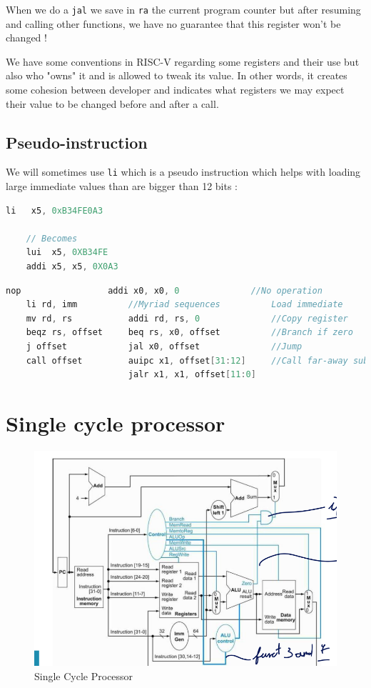 \documentclass{report}
\begin{document}
When we do a \verb|jal| we save in \verb|ra| the current program counter but after resuming and calling other functions, we have no guarantee that this register won't be changed !

We have some conventions in RISC-V regarding some registers and their use but also who "owns" it and is allowed to tweak its value. In other words, it creates some cohesion between developer and indicates what registers we may expect their value to be changed before and after a call.


\subsection{Pseudo-instruction}
\label{macro}

We will sometimes use \verb|li| which is a pseudo instruction which helps with loading large immediate values than are bigger than 12 bits :\\

\begin{lstlisting}[language=C]
    li   x5, 0xB34FE0A3

    // Becomes
    lui  x5, 0XB34FE
    addi x5, x5, 0X0A3
\end{lstlisting}

\begin{lstlisting}[language=C,caption=Other Pseudo instructions]
    nop                 addi x0, x0, 0              //No operation
    li rd, imm          //Myriad sequences          Load immediate
    mv rd, rs           addi rd, rs, 0              //Copy register
    beqz rs, offset     beq rs, x0, offset          //Branch if zero
    j offset            jal x0, offset              //Jump
    call offset         auipc x1, offset[31:12]     //Call far-away subroutine
                        jalr x1, x1, offset[11:0]
\end{lstlisting}






\section{Single cycle processor}
\label{scp}
\begin{figure}[H]
    \centering
    \includegraphics[width=0.65\linewidth]{single_cycle_proc.png}
    \caption{Single Cycle Processor}
    \label{fig:enter-label}
\end{figure}
\end{document}
